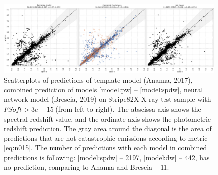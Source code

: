 \documentclass[fleqn,usenatbib]{mnras}
\begin{document}
\begin{figure}
    \centering
    \includegraphics[width=0.9\linewidth]{images/stripe82x-sota35-colored_final.png}
    \caption{Scatterplots of predictions of template model (Ananna, 2017), combined prediction of models \ref{model:pw} -- \ref{model:spdw}, neural network model (Brescia, 2019) on Stripe82X X-ray test sample with $FSoft > 3e-15$ (from left to right). The abscissa axis shows the spectral redshift value, and the ordinate axis shows the photometric redshift prediction. The gray area around the diagonal is the area of predictions that are not catastrophic emissions according to metric \eqref{eq:n015}. The number of predictions with each model in combined predictions is following: \ref{model:spdw} -- 2197, \ref{model:dw} -- 442, has no prediction, comparing to Ananna and Brescia -- 11.}
    \label{fig:scatter-s82x-sota35}
\end{figure}
\end{document}
